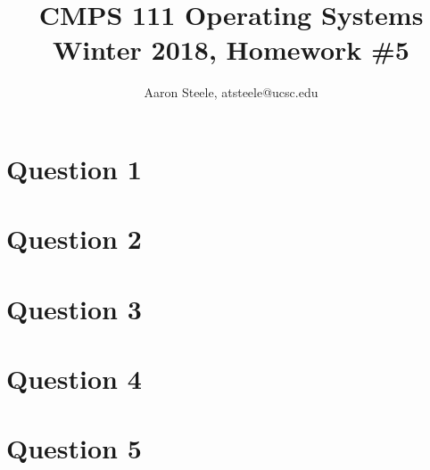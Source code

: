 \documentclass[12pt]{article}
\title{\textbf{CMPS 111 Operating Systems\\ Winter 2018, Homework \#5}}
\date{}
\author{Aaron Steele, atsteele@ucsc.edu}
\begin{document}
	
	\maketitle
	
	\section*{Question 1}

	
	
	\section*{Question 2}

	
	\section*{Question 3}

	\section*{Question 4}

	
	\section*{Question 5}	

	
\end{document}
